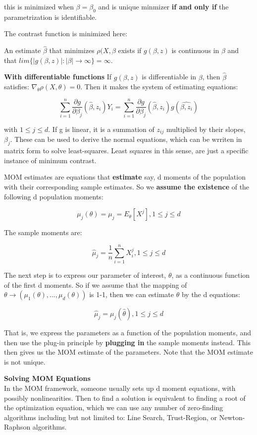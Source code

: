 				this is minimized when $\beta = \beta_0$ and is unique minmizer \textbf{if and only if} the parametrization is identifiable. 

				The contrast function is minimized here:

				An estimate $\hat{\beta}$ that minimizes $\rho(X, \beta$ exists if $g(\beta, z)$ is continuous in $\beta$ and that $lim\{|g(\beta, z)| : |\beta| \rightarrow \infty \} = \infty$.

				\textbf{With differentiable functions}
				If $g(\beta, z)$ is differentiable in $\beta$, then $\hat{\beta}$ satisfies: $\nabla_\theta \rho(X, \theta) = 0$. Then it makes the system of estimating equations:

					$$\sum_{i=1}^n \frac{\partial g}{\partial \beta_j} (\hat{\beta}, z_i) Y_i = \sum_{i=1}^n \frac{\partial g}{\partial \beta_j} (\hat{\beta}, z_i) g(\hat{\beta, z_i})$$

				with $1 \le j \le d$. If g is linear, it is a summation of $z_{ij}$ multiplied by their slopes, $\beta_j$. These can be used to derive the normal equations, which can be wrriten in matrix form to solve least-squares. Least squares in this sense, are just a specific instance of minimum contrast.

				MOM estimates are equations that \textbf{estimate} say, d moments of the population with their corresponding sample estimates. So we \textbf{assume the existence} of the following d population moments:

				$$\mu_j(\theta) = \mu_j = E_\theta [ X^j ], 1 \le j \le d$$

				The sample moments are:

				$$\hat{\mu}_j = \frac{1}{n} \sum_{i=1}^n X_i^j, 1 \le j \le d$$

				The next step is to express our parameter of interest, $\theta$, as a continuous function of the first d moments. So if we assume that the mapping of $\theta \rightarrow (\mu_1(\theta), ..., \mu_d(\theta))$ is 1-1, then we can estimate $\theta$ by the d equations:

				$$\hat{\mu}_j = \mu_j(\hat{\theta}), 1 \le j \le d$$

				That is, we express the parameters as a function of the population moments, and then use the plug-in principle by \textbf{plugging in} the sample moments instead. This then gives us the MOM estimate of the parameters. Note that the MOM estimate is not unique.

				\textbf{Solving MOM Equations}\\
				In the MOM framework, someone usually sets up d moment equations, with possibly nonlinearities. Then to find a solution is equivalent to finding a root of the optimization equation, which we can use any number of zero-finding algorithms including but not limited to: Line Search, Trust-Region, or Newton-Raphson algorithms.

